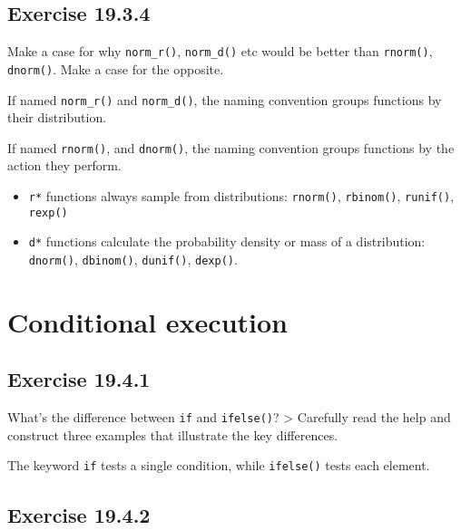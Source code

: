 \documentclass[]{book}
\providecommand{\tightlist}{%
  \setlength{\itemsep}{0pt}\setlength{\parskip}{0pt}}
\theoremstyle{plain}
\theoremstyle{remark}
\theoremstyle{definition}
\theoremstyle{definition}
\theoremstyle{definition}
\theoremstyle{remark}
\begin{document}
\hypertarget{exercise-19.3.4}{%
\subsection*{\texorpdfstring{Exercise
{19.3.4}}{Exercise 19.3.4}}\label{exercise-19.3.4}}

Make a case for why \texttt{norm\_r()}, \texttt{norm\_d()} etc would be
better than \texttt{rnorm()}, \texttt{dnorm()}. Make a case for the
opposite.

If named \texttt{norm\_r()} and \texttt{norm\_d()}, the naming
convention groups functions by their distribution.

If named \texttt{rnorm()}, and \texttt{dnorm()}, the naming convention
groups functions by the action they perform.

\begin{itemize}
\tightlist
\item
  \texttt{r*} functions always sample from distributions:
  \texttt{rnorm()}, \texttt{rbinom()}, \texttt{runif()}, \texttt{rexp()}
\item
  \texttt{d*} functions calculate the probability density or mass of a
  distribution: \texttt{dnorm()}, \texttt{dbinom()}, \texttt{dunif()},
  \texttt{dexp()}.
\end{itemize}

\hypertarget{conditional-execution}{%
\section{Conditional execution}\label{conditional-execution}}

\hypertarget{exercise-19.4.1}{%
\subsection*{\texorpdfstring{Exercise
{19.4.1}}{Exercise 19.4.1}}\label{exercise-19.4.1}}

What's the difference between \texttt{if} and \texttt{ifelse()}?
\textgreater{} Carefully read the help and construct three examples that
illustrate the key differences.

The keyword \texttt{if} tests a single condition, while
\texttt{ifelse()} tests each element.

\hypertarget{exercise-19.4.2}{%
\subsection*{\texorpdfstring{Exercise
{19.4.2}}{Exercise 19.4.2}}\label{exercise-19.4.2}}
\end{document}
